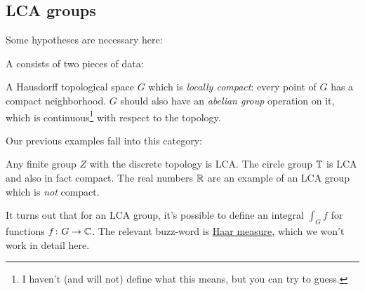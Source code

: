 \subsection{LCA groups}
Some hypotheses are necessary here:
\begin{definition}
	A 
	consists of two pieces of data:
	\begin{itemize}
		\ii A Hausdorff topological space $G$
		which is \emph{locally compact}:
		every point of $G$ has a compact neighborhood.
		\ii $G$ should also have an \emph{abelian group} operation on it,
		which is continuous\footnote{I haven't (and will not)
			define what this means, but you can try to guess.}
		with respect to the topology.
	\end{itemize}
\end{definition}
Our previous examples fall into this category:
\begin{example}
	\listhack
	\begin{itemize}
		\ii Any finite group $Z$ with the discrete topology is LCA.
		\ii The circle group $\mathbb T$ is LCA and also in fact compact.
		\ii The real numbers $\mathbb R$ are an example of an LCA group
		which is \emph{not} compact.
	\end{itemize}
\end{example}
It turns out that for an LCA group,
it's possible to define an integral $\int_G f$
for functions $f \colon G \to \mathbb C$.
The relevant buzz-word is
\href{https://en.wikipedia.org/wiki/Haar_measure}{Haar measure},
which we won't work in detail here.


